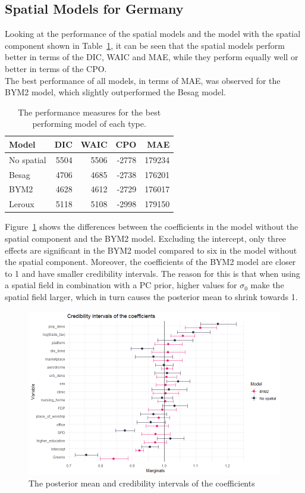 \subsection{Spatial Models for Germany}
Looking at the performance of the spatial models and the model with the spatial component shown in Table~\ref{allGermany}, it can be seen that the spatial models perform better in terms of the DIC, WAIC and MAE, while they perform equally well or better in terms of the CPO. \\
The best performance of all models, in terms of MAE, was observed for the BYM2 model, which slightly outperformed the Besag model.
\begin{table}[H] 
\caption{The performance measures for the best performing model of each type. \label{allGermany}}
\begin{tabular}{l r r r r}
\toprule
\textbf{Model}	& \textbf{DIC}	& \textbf{WAIC} & \textbf{CPO} & \textbf{MAE}\\
\midrule
No spatial & 5504 & 5506 & -2778 & 179234 \\
Besag& 4706 & 4685 & -2738 & 176201\\
BYM2 & 4628 & 4612 & -2729 & 176017\\
Leroux & 5118 & 5108 & -2998 & 179150 \\
\bottomrule
\end{tabular}
\end{table}
Figure~\ref{intervalGermany} shows the differences between the coefficients in the model without the spatial component and the BYM2 model. Excluding the intercept, only three effects are significant in the BYM2 model compared to six in the model without the spatial component. Moreover, the coefficients of the BYM2 model are closer to 1 and have smaller credibility intervals. The reason for this is that when using a spatial field in combination with a PC prior, higher values for $\sigma_0$ make the spatial field larger, which in turn causes the posterior mean to shrink towards 1.
\begin{figure}[H]
  \centering
  \includegraphics[width = \textwidth]{intervals_germany.png}
  \caption{The posterior mean and credibility intervals of the coefficients}
  \label{intervalGermany}
\end{figure}
